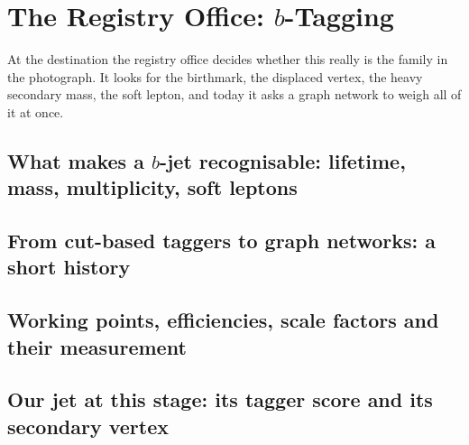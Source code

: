 \chapter{The Registry Office: $b$-Tagging}
\label{ch:registry_office}

\begin{journeybox}
At the destination the registry office decides whether this really is the family
in the photograph. It looks for the birthmark, the displaced vertex, the heavy
secondary mass, the soft lepton, and today it asks a graph network to weigh all
of it at once.
\end{journeybox}


\section{What makes a $b$-jet recognisable: lifetime, mass, multiplicity, soft leptons}
\label{sec:registry_office:what_makes_a_b_jet_recognisable_lifetime}

\section{From cut-based taggers to graph networks: a short history}
\label{sec:registry_office:from_cut_based_taggers_to_graph_networks}

\section{Working points, efficiencies, scale factors and their measurement}
\label{sec:registry_office:working_points_efficiencies_scale_factor}

\section{Our jet at this stage: its tagger score and its secondary vertex}
\label{sec:registry_office:our_jet_at_this_stage_its_tagger_score_a}

